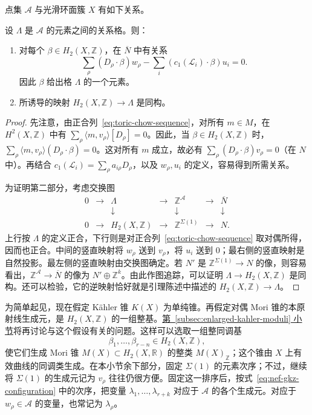 点集 $\mathcal A$ 与光滑环面簇 $X$ 有如下关系。
\begin{lemma}\label{lem:nef-relation-lattice}
设 $\Lambda$ 是 $\mathcal A$ 的元素之间的关系格。则：
\begin{enumerate}[label=(\roman*)]
\item 对每个 $\beta\in H_2(X,\mathbb Z)$，在 $\overline N$ 中有关系
\[
\sum_\rho(D_\rho\cdot\beta)w_\rho-
\sum_i(c_1(\mathcal L_i)\cdot\beta)u_i=0.
\]
因此 $\beta$ 给出格 $\Lambda$ 的一个元素。
\item 所诱导的映射 $H_2(X,\mathbb Z)\to\Lambda$ 是同构。
\end{enumerate}
\end{lemma}
\begin{proof}
先注意，由正合列~\eqref{eq:toric-chow-sequence}，对所有 $m\in M$，在 $H^2(X,\mathbb Z)$ 中有
$\sum_\rho\langle m,v_\rho\rangle[D_\rho]=0$。因此，当 $\beta\in H_2(X,\mathbb Z)$ 时，
$\sum_\rho\langle m,v_\rho\rangle(D_\rho\cdot\beta)=0$。这对所有 $m$ 成立，故必有
$\sum_\rho(D_\rho\cdot\beta)v_\rho=0$（在 $N$ 中）。再结合
$c_1(\mathcal L_i)=\sum_\rho a_{i\rho}D_\rho$，以及 $w_\rho,u_i$ 的定义，容易得到所需关系。

为证明第二部分，考虑交换图
\[
\begin{array}{ccccccc}
0&\longrightarrow&\Lambda&\longrightarrow&\mathbb Z^{\mathcal A}&\longrightarrow&\overline N\\
&&\downarrow&&\downarrow&&\downarrow\\
0&\longrightarrow&H_2(X,\mathbb Z)&\longrightarrow&\mathbb Z^{\Sigma(1)}&\longrightarrow&N.
\end{array}
\]
上行按 $\Lambda$ 的定义正合，下行则是对正合列~\eqref{eq:toric-chow-sequence} 取对偶所得，因而也正合。中间的竖直映射将 $w_\rho$ 送到 $v_\rho$，将 $u_i$ 送到 $0$；最右侧的竖直映射是自然投影。最左侧的竖直映射由交换图确定。若 $N'$ 是 $\mathbb Z^{\Sigma(1)}\to N$ 的像，则容易看出，$\mathbb Z^{\mathcal A}\to\overline N$ 的像为 $N'\oplus\mathbb Z^k$。由此作图追踪，可以证明 $\Lambda\to H_2(X,\mathbb Z)$ 是同构。还可以检验，它的逆映射恰好就是引理陈述中描述的 $H_2(X,\mathbb Z)\to\Lambda$。
\end{proof}

为简单起见，现在假定 Kähler 锥 $K(X)$ 为单纯锥。再假定对偶 Mori 锥的本原射线生成元，是 $H_2(X,\mathbb Z)$ 的一组整基。\hyperref[subsec:enlarged-kahler-moduli]{第~\ref*{subsec:enlarged-kahler-moduli} 小节}将再讨论与这个假设有关的问题。这样可以选取一组整同调基
\[
\beta_1,\ldots,\beta_{r-n}\in H_2(X,\mathbb Z),
\]
使它们生成
Mori 锥 $M(X)\subset H_2(X,\mathbb R)$ 的整类 $M(X)_{\mathbb Z}$；这个锥由 $X$ 上有效曲线的同调类生成。在本小节余下部分，固定 $\Sigma(1)$ 的元素次序；不过，继续将 $\Sigma(1)$ 的生成元记为 $v_\rho$ 往往仍很方便。固定这一排序后，按式~\eqref{eq:nef-gkz-configuration} 中的次序，把变量 $\lambda_1,\ldots,\lambda_{r+k}$ 对应于 $\mathcal A$ 的各个生成元。对应于 $w_\rho\in\mathcal A$ 的变量，也常记为 $\lambda_\rho$。

